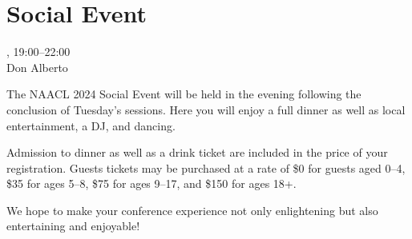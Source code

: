 \clearpage
\section{Social Event}
\setheaders{}{\daydateyear}

\begin{center}



\daydateyear, 19:00--22:00 \vspace{1em}\\
Don Alberto\\
\end{center}

The NAACL 2024 Social Event will be held in the evening following the
conclusion of Tuesday's sessions. Here you will enjoy a full dinner
as well as local entertainment, a DJ, and dancing.

Admission to dinner as well as a drink ticket are included in the
price of your registration. Guests tickets may be
purchased at a rate of \$0 for guests aged 0--4, \$35 for ages 5--8,
\$75 for ages 9--17, and \$150 for ages 18+.

We hope to make your conference experience not only enlightening but
also entertaining and enjoyable! 
